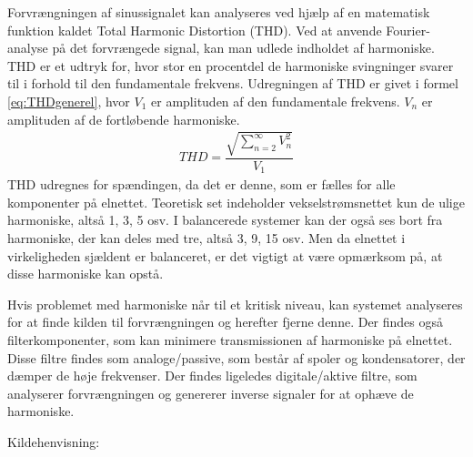 Forvrængningen af sinussignalet kan analyseres ved hjælp af en matematisk funktion kaldet Total Harmonic Distortion (THD). Ved at anvende Fourier-analyse på det forvrængede signal, kan man udlede indholdet af harmoniske. THD er et udtryk for, hvor stor en procentdel de harmoniske svingninger svarer til i forhold til den fundamentale frekvens. Udregningen af THD er givet i formel \ref{eq:THDgenerel}, hvor $V_1$ er amplituden af den fundamentale frekvens. $V_n$ er amplituden af de fortløbende harmoniske. 
\begin{align}
THD = \dfrac{\sqrt{\sum_{n=2}^{\infty}V_n^{2}}}{V_{1}}
\label{eq:THDgenerel}
\end{align}
THD udregnes for spændingen, da det er denne, som er fælles for alle komponenter på elnettet. Teoretisk set indeholder vekselstrømsnettet kun de ulige harmoniske, altså 1, 3, 5 osv. I balancerede systemer kan der også ses bort fra harmoniske, der kan deles med tre, altså 3, 9, 15 osv. Men da elnettet i virkeligheden sjældent er balanceret, er det vigtigt at være opmærksom på, at disse harmoniske kan opstå. \newline

Hvis problemet med harmoniske når til et kritisk niveau, kan systemet analyseres for at finde kilden til forvrængningen og herefter fjerne denne. Der findes også filterkomponenter, som kan minimere transmissionen af harmoniske på elnettet. Disse filtre findes som analoge/passive, som består af spoler og kondensatorer, der dæmper de høje frekvenser. Der findes ligeledes digitale/aktive filtre, som analyserer forvrængningen og genererer inverse signaler for at ophæve de harmoniske.\cite{HarmoniskeFiltre}\newline


Kildehenvisning: \cite{HarmoniskeVideo}
 

